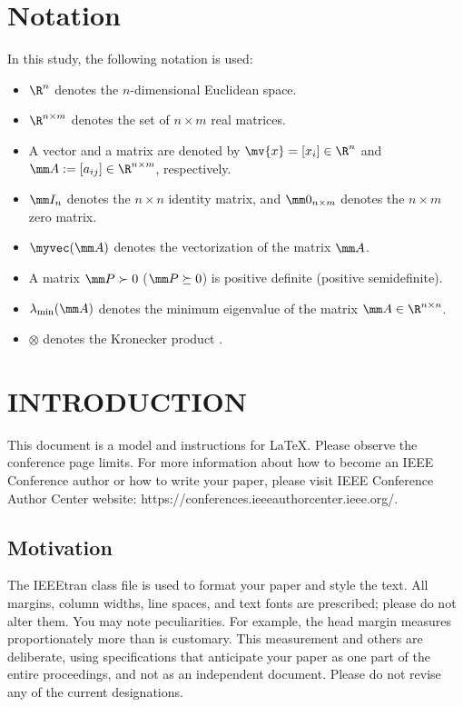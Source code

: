 \documentclass[conference]{IEEEtran}
\begin{document}
\section*{Notation}
In this study, the following notation is used:
\begin{itemize}
  \item $\R^n$ denotes the $n$-dimensional Euclidean space.
  \item $\R^{n\times m}$ denotes the set of $n\times m$ real matrices.
  \item A vector and a matrix are denoted by $\mv{x}=[x_i]\in\R^n$ and $\mm
          A:=[a_{ij}]\in\R^{n\times m}$, respectively.
  \item $\mm I_n$ denotes the $n\times n$ identity matrix, and $\mm 0_{n\times
              m}$ denotes the $n\times m$ zero matrix.
  \item $\myvec(\mm A)$ denotes the vectorization of the matrix $\mm A$.
  \item A matrix $\mm P \succ 0$ ($\mm P \succeq 0$) is positive definite
        (positive semidefinite).
  \item $\lambda_{\min}(\mm A)$ denotes the minimum eigenvalue of the matrix
        $\mm A \in \R^{n \times n}$.
  \item $\otimes$ denotes the Kronecker product \cite{Bernstein:2009aa}.
\end{itemize}



\section{INTRODUCTION}
This document is a model and instructions for \LaTeX.
Please observe the conference page limits. For more information about how to become an IEEE Conference author or how to write your paper, please visit   IEEE Conference Author Center website: https://conferences.ieeeauthorcenter.ieee.org/.

\subsection{Motivation}

The IEEEtran class file is used to format your paper and style the text. All margins, 
column widths, line spaces, and text fonts are prescribed; please do not 
alter them. You may note peculiarities. For example, the head margin
measures proportionately more than is customary. This measurement 
and others are deliberate, using specifications that anticipate your paper 
as one part of the entire proceedings, and not as an independent document. 
Please do not revise any of the current designations.
\end{document}
